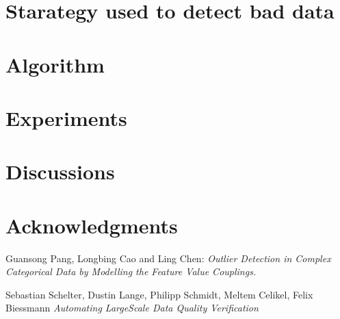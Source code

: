 \documentclass{article}
\begin{document}

\section{Starategy used to detect bad data} %
\label{sec:Starategy used to detect bad data}




\section{Algorithm} %
\label{sec:Algorithm}




\section{Experiments} %
\label{sec:Experiments}




\section{Discussions} %
\label{sec:Discussions}




\section*{Acknowledgments} %
\label{sec:Acknowledgments}




\begin{thebibliography}{999}

    Guansong Pang, Longbing Cao and Ling Chen:
    \emph{Outlier Detection in Complex Categorical Data
        by Modelling the Feature Value Couplings.}

    Sebastian Schelter, Dustin Lange, Philipp Schmidt, Meltem Celikel, Felix Biessmann
    \emph{Automating LargeScale Data Quality Verification}


\end{thebibliography}
\end{document}
